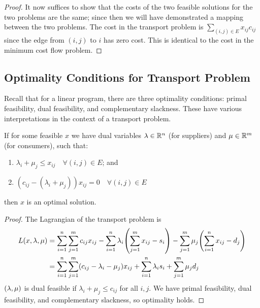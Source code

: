 \begin{proof}
    \medskip\noindent It now suffices to show that the costs of the two feasible solutions for the two problems are the same; since then we will have demonstrated a mapping between the two problems.
    The cost in the transport problem is \( \sum_{(i,j) \in E} x_{ij} c_{ij} \) since the edge from \( (i,j) \) to \( i \) has zero cost.
    This is identical to the cost in the minimum cost flow problem.
\end{proof}

\subsection{Optimality Conditions for Transport Problem}
Recall that for a linear program, there are three optimality conditions: primal feasibility, dual feasibility, and complementary slackness.
These have various interpretations in the context of a transport problem.
\begin{theorem}
    If for some feasible \( x \) we have dual variables \( \vb \lambda \in \mathbb R^n \) (for suppliers) and \( \vb \mu \in \mathbb R^m \) (for consumers), such that:
    \begin{enumerate}
        \item \( \lambda_i + \mu_j \leq x_{ij} \quad \forall (i,j) \in E \); and
        \item \( (c_{ij} - (\lambda_i + \mu_j)) x_{ij} = 0 \quad \forall (i,j) \in E \)
    \end{enumerate}
    then \( x \) is an optimal solution.
\end{theorem}
\begin{proof}
    The Lagrangian of the transport problem is
    \begin{align*}
        L(x,\vb \lambda,\vb \mu) &= \sum_{i=1}^n \sum_{j=1}^m c_{ij}x_{ij} - \sum_{i=1}^n \lambda_i \qty(\sum_{j=1}^m x_{ij} - s_i) - \sum_{j=1}^m \mu_j \qty(\sum_{i=1}^n x_{ij} - d_j) \\
        &= \sum_{i=1}^n \sum_{j=1}^m (c_{ij} - \lambda_i - \mu_j) x_{ij} + \sum_{i=1}^n \lambda_i s_i + \sum_{j=1}^m \mu_j d_j
    \end{align*}
    \( (\vb \lambda, \vb \mu) \) is dual feasible if \( \lambda_i + \mu_j \leq c_{ij} \) for all \( i,j \).
    We have primal feasibility, dual feasibility, and complementary slackness, so optimality holds.
\end{proof}
